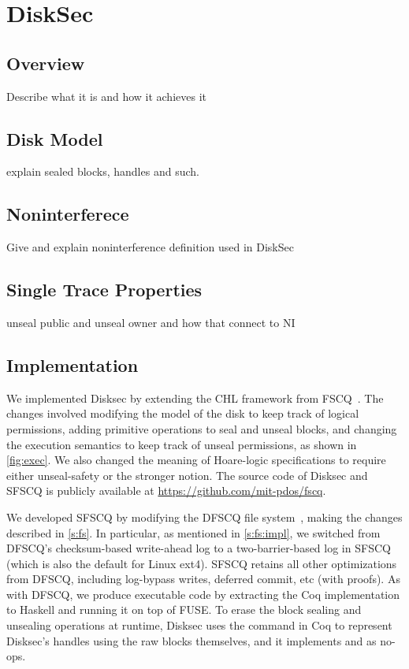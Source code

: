 \chapter{DiskSec}

\section{Overview}
Describe what it is and how it achieves it

\section{Disk Model}
explain sealed blocks, handles and such.

\section{Noninterferece}
Give and explain noninterference definition used in DiskSec

\section{Single Trace Properties}
unseal public and unseal owner and how that connect to NI



\section{Implementation}
\label{s:impl}

We implemented Disksec by extending the CHL framework from
FSCQ~\cite{chen:fscq}.  The changes involved modifying the model of the
disk to keep track of logical permissions, adding primitive operations
to seal and unseal blocks, and changing the execution semantics to keep
track of unseal permissions, as shown in \autoref{fig:exec}.  We also
changed the meaning of Hoare-logic specifications to require either
unseal-safety or the stronger  notion.  The source
code of Disksec and SFSCQ is publicly available at
\url{https://github.com/mit-pdos/fscq}.

We developed SFSCQ by modifying the DFSCQ file system~\cite{chen:dfscq},
making the changes described in \autoref{s:fs}.  In particular, as
mentioned in \autoref{s:fs:impl}, we switched from DFSCQ's checksum-based
write-ahead log to a two-barrier-based log in SFSCQ (which is also the
default for Linux ext4).  SFSCQ retains all other optimizations from
DFSCQ, including log-bypass writes, deferred commit, etc (with proofs).
As with DFSCQ, we produce executable code by extracting the Coq
implementation to Haskell and running it on top of FUSE\@.  To erase
the block sealing and unsealing operations at runtime, Disksec uses
the  command in Coq to represent Disksec's
handles using the raw blocks themselves, and it implements 
and  as no-ops.

